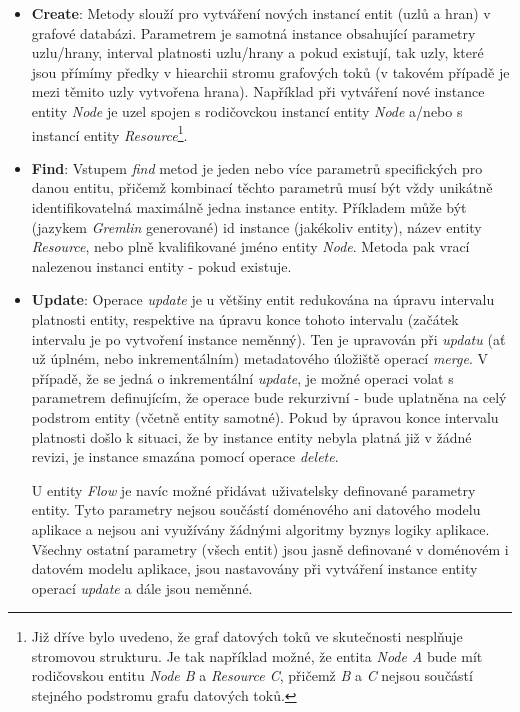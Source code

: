 \begin{itemize}
   \item{\textbf{Create}}: Metody slouží pro vytváření nových instancí entit (uzlů a hran) v grafové databázi. Parametrem je samotná instance obsahující parametry uzlu/hrany, interval platnosti uzlu/hrany a pokud existují, tak uzly, které jsou přímímy předky v hiearchii stromu grafových toků (v takovém případě je mezi těmito uzly vytvořena hrana). Například při vytváření nové instance entity \textit{Node} je uzel spojen s rodičovckou instancí entity \textit{Node} a/nebo s instancí entity \textit{Resource}\footnote{Již dříve bylo uvedeno, že graf datových toků ve skutečnosti nesplňuje stromovou strukturu. Je tak například možné, že entita \textit{Node A} bude mít rodičovskou entitu \textit{Node B} a \textit{Resource C}, přičemž \textit{B} a \textit{C} nejsou součástí stejného podstromu grafu datových toků.}.

   \item{\textbf{Find}}: Vstupem \textit{find} metod je jeden nebo více parametrů specifických pro danou entitu, přičemž kombinací těchto parametrů musí být vždy unikátně identifikovatelná maximálně jedna instance entity. Příkladem může být (jazykem \textit{Gremlin} generované) id instance (jakékoliv entity), název entity \textit{Resource}, nebo plně kvalifikované jméno entity \textit{Node}. Metoda pak vrací nalezenou instanci entity - pokud existuje.

   \item{\textbf{Update}}: Operace \textit{update} je u většiny entit redukována na úpravu intervalu platnosti entity, respektive na úpravu konce tohoto intervalu (začátek intervalu je po vytvoření instance neměnný). Ten je upravován při \textit{updatu} (ať už úplném, nebo inkrementálním) metadatového úložiště operací \textit{merge}. V případě, že se jedná o inkrementální \textit{update}, je možné operaci volat s parametrem definujícím, že operace bude rekurzivní - bude uplatněna na celý podstrom entity (včetně entity samotné). Pokud by úpravou konce intervalu platnosti došlo k situaci, že by instance entity nebyla platná již v žádné revizi, je instance smazána pomocí operace \textit{delete}.

    U entity \textit{Flow} je navíc možné přidávat uživatelsky definované parametry entity. Tyto parametry nejsou součástí doménového ani datového modelu aplikace a nejsou ani využívány žádnými algoritmy byznys logiky aplikace. Všechny ostatní parametry (všech entit) jsou jasně definované v doménovém i datovém modelu aplikace, jsou nastavovány při vytváření instance entity operací \textit{update} a dále jsou neměnné.


\end{itemize}

